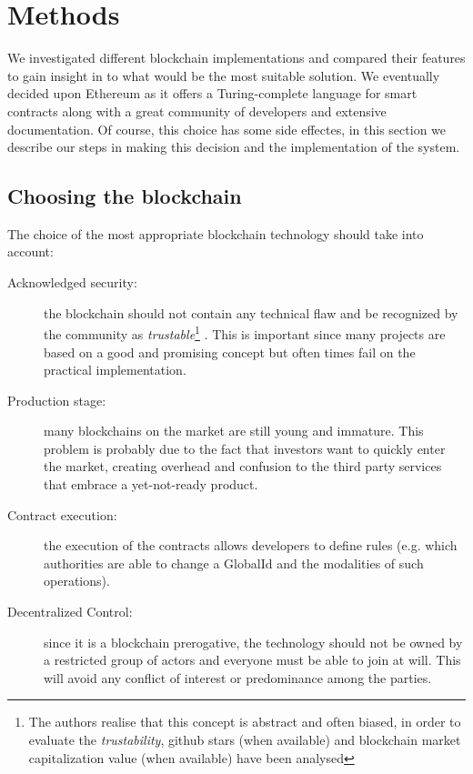 \section{Methods}
\label{S:4}

We investigated different blockchain implementations and compared their features to gain insight in to what would be the most suitable solution. We eventually decided upon Ethereum as it offers a Turing-complete language for smart contracts along with a great community of developers and extensive documentation. Of course, this choice has some side effectes, in this section we describe our steps in making this decision and the implementation of the system.  

\subsection{Choosing the blockchain}

The choice of the most appropriate blockchain technology should take into account:
\begin{description}
  \item[Acknowledged security:] the blockchain should not contain any technical flaw and be recognized by the community as \textit{trustable}\footnote{The authors realise that this concept is abstract and often biased, in order to evaluate the \textit{trustability}, github stars (when available) and blockchain market capitalization value (when available) have been analysed} . This is important since many projects are based on a good and promising concept but often times fail on the practical implementation.
  \item[Production stage:] many blockchains on the market are still young and immature. This problem is probably due to the fact that investors want to quickly enter the market, creating overhead and confusion to the third party services that embrace a yet-not-ready product.
  \item[Contract execution:] the execution of the contracts allows developers to define rules (e.g. which authorities are able to change a GlobalId and the modalities of such operations).
  \item[Decentralized Control:] since it is a blockchain prerogative, the technology should not be owned by a restricted group of actors and everyone must be able to join at will. This will avoid any conflict of interest or predominance among the parties.
\end{description}

